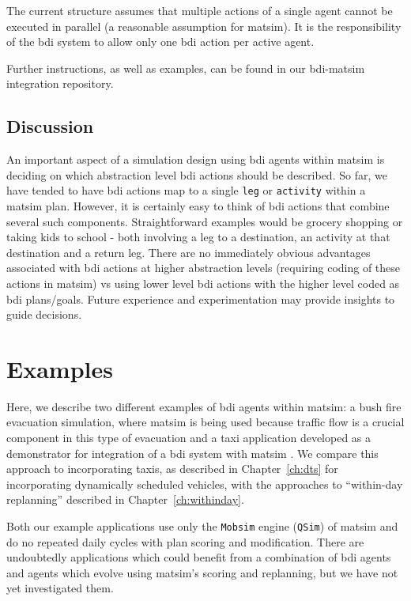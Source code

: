The current structure assumes that multiple actions of a single agent
cannot be executed in parallel (a reasonable assumption for
\gls{matsim}). It is the responsibility of the \gls{bdi} system to allow only
one \gls{bdi} action per active agent.

Further instructions, as well as examples, can be found in our
\gls{bdi}-\gls{matsim} integration repository.

\subsection{Discussion}
An important aspect of a simulation design using \gls{bdi} agents
within \gls{matsim} is deciding on which abstraction level \gls{bdi}
actions should be described. So far, we have tended to have \gls{bdi}
actions map to a single \lstinline{leg} or \lstinline{activity} within a
\gls{matsim} plan. However, it is certainly easy to think of \gls{bdi} actions
that combine several such components. Straightforward examples would
be grocery shopping or taking kids to school - both involving a
leg to a destination, an activity at that destination and a return
leg. There are no immediately obvious advantages associated with \gls{bdi}
actions at higher abstraction levels (requiring coding of these
actions in \gls{matsim}) vs using lower level \gls{bdi} actions with the higher
level coded as \gls{bdi} plans/goals. Future experience and experimentation
may provide insights to guide decisions.

\section{Examples}
\label{sec:bid-examples}
Here, we describe two different examples of \gls{bdi} agents within
\gls{matsim}: a bush fire evacuation simulation, where \gls{matsim} is
being used because traffic flow is a crucial component in this type of
evacuation and a taxi application developed as a
demonstrator for integration of a \gls{bdi} system with \gls{matsim} \citep{ecai}. We 
compare this approach to incorporating taxis, as
described in Chapter~\ref{ch:dts} for
incorporating dynamically scheduled vehicles, with the approaches
to ``within-day replanning'' described in Chapter~\ref{ch:withinday}.

%
Both our example applications use only the \lstinline{Mobsim} engine
(\lstinline{QSim}) of \gls{matsim} and do no repeated daily cycles
with plan scoring and modification. There are undoubtedly applications which
could benefit from a combination of \gls{bdi} agents and agents which evolve using
\gls{matsim}'s scoring and replanning, but we have not yet investigated them.

